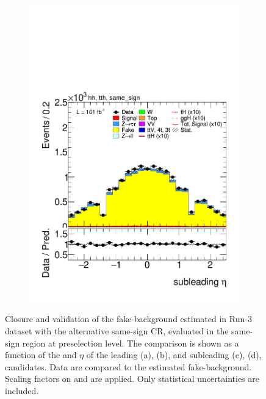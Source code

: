 \begin{figure}[htbp]
\begin{subfigure}[b]{0.45\textwidth}
    \includegraphics[width=\textwidth]{images/same_sign_same_sign_run3/plot_tau_1_eta_hh_tth_22_23_24_same_sign.pdf}
    \caption{}
  \end{subfigure}
  \caption{
    Closure and validation of the fake-\tauhad background estimated in Run-3 dataset with the alternative same-sign \tauhadhad CR, evaluated in the same-sign region at preselection level.
    The comparison is shown as a function of the \pt and $\eta$ of the leading (a), (b), and subleading (c), (d), \tauhad candidates. 
    Data are compared to the estimated fake-\tauhad background. Scaling factors on \ztautau and \ttbar are applied. Only statistical uncertainties are included.
  }
  \label{fig:closure_validation_same_sign_run3}
\end{figure}
  
